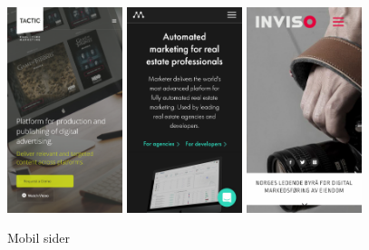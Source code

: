 \begin{figure}[bh]
    \begin{center}
        \includegraphics[width=0.3\textwidth]{line/tacticrealtime_com_(iPhone_6_7_8).png}
        \includegraphics[width=0.3\textwidth]{line/marketer_tech_(iPhone_6_7_8).png}
        \includegraphics[width=0.3\textwidth]{line/inviso_no_(iPhone_6_7_8).png}
        \caption{Mobil sider}
        \label{fig:competitors-mobile}
    \end{center}
\end{figure}


